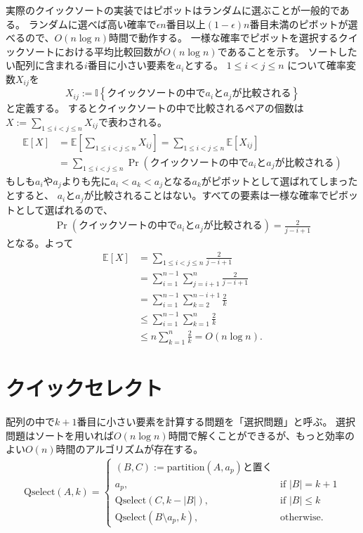 \documentclass[a4paper,twoside,onecolumn,openany,article,10pt]{memoir}
\theoremstyle{remark}
\begin{document}
実際のクイックソートの実装ではピボットはランダムに選ぶことが一般的である。
ランダムに選べば高い確率で$\epsilon n$番目以上$(1-\epsilon) n$番目未満のピボットが選べるので、$O(n\log n)$時間で動作する。
一様な確率でピボットを選択するクイックソートにおける平均比較回数が$O(n\log n)$であることを示す。
ソートしたい配列に含まれる$i$番目に小さい要素を$a_i$とする。
$1\le i<j\le n$ について確率変数$X_{ij}$を
\begin{equation*}
X_{ij} := \mathbb{I}\left\{\text{クイックソートの中で$a_i$と$a_j$が比較される}\right\}
\end{equation*}
と定義する。
するとクイックソートの中で比較されるペアの個数は$X:=\sum_{1\le i<j\le n} X_{ij}$で表わされる。
\begin{align*}
\mathbb{E}[X] &=
\mathbb{E}\left[\sum_{1\le i<j\le n} X_{ij}\right]
=
\sum_{1\le i<j\le n} \mathbb{E}[X_{ij}]\\
&=
\sum_{1\le i<j\le n} \Pr\left(\text{クイックソートの中で$a_i$と$a_j$が比較される}\right)
\end{align*}
もしも$a_i$や$a_j$よりも先に$a_i < a_k < a_j$となる$a_k$がピボットとして選ばれてしまったとすると、
$a_i$と$a_j$が比較されることはない。すべての要素は一様な確率でピボットとして選ばれるので、
\begin{align*}
\Pr\left(\text{クイックソートの中で$a_i$と$a_j$が比較される}\right) = \frac2{j-i+1}
\end{align*}
となる。よって
\begin{align*}
\mathbb{E}[X] &=
\sum_{1\le i<j\le n} \frac2{j-i+1}\\
&= \sum_{i=1}^{n-1} \sum_{j=i+1}^n \frac2{j-i+1}\\
&= \sum_{i=1}^{n-1} \sum_{k=2}^{n-i+1} \frac2{k}\\
&\le \sum_{i=1}^{n-1} \sum_{k=1}^{n} \frac2{k}\\
&\le n\sum_{k=1}^{n} \frac2{k} = O(n\log n).
\end{align*}
\fi

\section{クイックセレクト}
配列の中で$k+1$番目に小さい要素を計算する問題を「選択問題」と呼ぶ。
選択問題はソートを用いれば$O(n\log n)$時間で解くことができるが、もっと効率のよい$O(n)$時間のアルゴリズムが存在する。
\begin{align*}
\mathrm{Qselect}(A, k) =
\begin{cases}
(B, C) := \mathrm{partition}(A, a_p)\text{と置く}\\
a_p,& \text{if } |B| = k+1\\
\mathrm{Qselect}(C, k-|B|),&\text{if } |B| \le k\\
\mathrm{Qselect}(B\setminus a_p, k),&\text{otherwise.}
\end{cases}
\end{align*}
\end{document}
